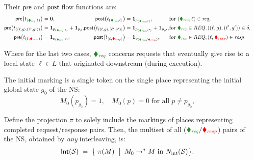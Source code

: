 Their \(\mathsf{pre}\) and \(\mathsf{post}\) flow functions are:
\[
\begin{alignedat}{3}
	\mathsf{pre}\bigl(t_{({\color{ForestGreen}\blacklozenge_{\mathit{req}}},\ell)}\bigr)
	&= \mathbf0, &
	\mathsf{post}\bigl(t_{({\color{ForestGreen}\blacklozenge_{\mathit{req}}},\ell)}\bigr)
	&= \mathbf1_{p_{({\color{ForestGreen}\blacklozenge_{\mathit{req}}},\ell)}}, 
	&&\text{for }({\color{ForestGreen}\blacklozenge_{\mathit{req}}},\ell)\in\mathit{req},\\
	\mathsf{pre}\bigl(t_{((\ell,g),(\ell',g'))}\bigr)
	&= \mathbf1_{p_{({\color{ForestGreen}\blacklozenge_{\mathit{req}}},\ell)}} + \mathbf1_{p_g}, &
	\mathsf{post}\bigl(t_{((\ell,g),(\ell',g'))}\bigr)
	&= \mathbf1_{p_{({\color{ForestGreen}\blacklozenge_{\mathit{req}}},\ell')}} + \mathbf1_{p_{g'}}, 
	&&\text{for }{{\color{ForestGreen}\blacklozenge_{\mathit{req}}}\in\mathit{REQ}}, ((\ell,g),(\ell',g'))\in\delta,\\
	\mathsf{pre}\bigl(t_{(\ell,{\color{red}\blacklozenge_{\mathit{resp}}})}\bigr)
	&= \mathbf1_{p_{({\color{ForestGreen}\blacklozenge_{\mathit{req}}},\ell)}}, &
	\mathsf{post}\bigl(t_{(\ell,{\color{red}\blacklozenge_{\mathit{resp}}})}\bigr)
	&= \mathbf1_{p_{({\color{ForestGreen}\blacklozenge_{\mathit{req}}}/{\color{red}\blacklozenge_{\mathit{resp}}})}}, 
	&&\text{for }{{\color{ForestGreen}\blacklozenge_{\mathit{req}}}\in\mathit{REQ},(\ell,\color{red}\blacklozenge_{\mathit{resp}}})\in\mathit{resp}
\end{alignedat}
\]

Where for the last two cases, \({\color{ForestGreen}\blacklozenge_{\mathit{req}}}\) concerns requests that eventually give rise to a local state \(\ell \in L\) that originated downstream (during execution).

\medskip
The initial marking is a single token on the single place representing the initial global state $g_0$ of the NS:
\[
M_0(p_{g_0}) = 1,
\quad
M_0(p) = 0 \text{ for all }p\neq p_{g_0},
\]



Define the projection \(\pi\) to solely include the markings of places representing completed request/response pairs.
Then, the multiset of all  (${{\color{ForestGreen}\blacklozenge_{\mathit{req}}}/{\color{red}\blacklozenge_{\mathit{resp}}}}$) pairs of the NS, obtained by \textit{any} interleaving, is:
\[
\mathsf{Int}(\mathcal S)
\;=\;
\bigl\{\;\pi(M)\;\bigm|\;M_0 \xrightarrow{}^{*} M\text{ in }N_{\mathrm{int}}(\mathcal S)\bigr\}.
\]